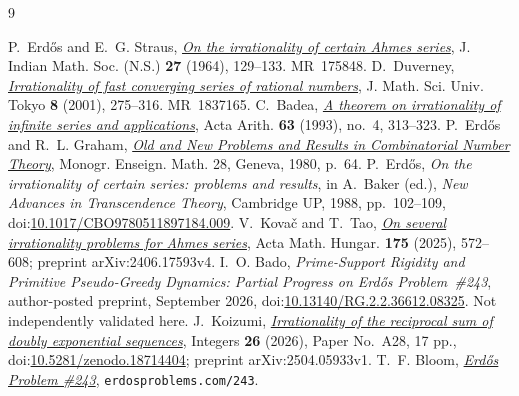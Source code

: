 \documentclass[11pt]{article}
\begin{document}
\begin{thebibliography}{9}
\small
\raggedright
\setlength{\itemsep}{0pt}
 P.~Erd\H{o}s and E.~G. Straus,
  \href{https://users.renyi.hu/~p_erdos/1964-19.pdf}{\emph{On the irrationality
  of certain Ahmes series}},
  J. Indian Math. Soc. (N.S.) \textbf{27} (1964), 129--133. MR~175848.
 D.~Duverney,
  \href{https://www.ms.u-tokyo.ac.jp/journal/pdf/jms080206.pdf}
  {\emph{Irrationality of fast converging series of rational numbers}},
  J. Math. Sci. Univ. Tokyo \textbf{8} (2001), 275--316. MR~1837165.
 C.~Badea,
  \href{https://matwbn.icm.edu.pl/ksiazki/aa/aa63/aa6342.pdf}{\emph{A theorem
  on irrationality of infinite series and applications}}, Acta Arith.
  \textbf{63} (1993), no.~4, 313--323.
 P.~Erd\H{o}s and R.~L. Graham,
  \href{https://mathweb.ucsd.edu/~ronspubs/80_11_number_theory.pdf}{\emph{Old
  and New Problems and Results in Combinatorial Number Theory}},
  Monogr. Enseign. Math. 28, Geneva, 1980, p.~64.
 P.~Erd\H{o}s, \emph{On the irrationality of certain series:
  problems and results}, in A.~Baker (ed.), \emph{New Advances in Transcendence
  Theory}, Cambridge UP, 1988, pp.~102--109,
  doi:\href{https://doi.org/10.1017/CBO9780511897184.009}{10.1017/CBO9780511897184.009}.
 V.~Kova\v{c} and T.~Tao,
  \href{https://arxiv.org/abs/2406.17593}{\emph{On several irrationality
  problems for Ahmes series}}, Acta Math. Hungar. \textbf{175} (2025),
  572--608; preprint arXiv:2406.17593v4.
 I.~O. Bado,
  \emph{Prime-Support Rigidity and Primitive Pseudo-Greedy Dynamics:
  Partial Progress on Erd\H{o}s Problem~\#243}, author-posted preprint,
  September 2026, doi:\href{https://doi.org/10.13140/RG.2.2.36612.08325}
  {10.13140/RG.2.2.36612.08325}.  Not independently validated here.
 J.~Koizumi,
  \href{https://math.colgate.edu/~integers/aa28/aa28.pdf}
  {\emph{Irrationality of the reciprocal sum of doubly exponential sequences}},
  Integers \textbf{26} (2026), Paper No.~A28, 17 pp.,
  doi:\href{https://doi.org/10.5281/zenodo.18714404}{10.5281/zenodo.18714404};
  preprint arXiv:2504.05933v1.
 T.~F. Bloom,
  \href{https://www.erdosproblems.com/243}{\emph{Erd\H{o}s Problem \#243}},
  \texttt{erdosproblems.com/243}.
\end{thebibliography}

\companionpapercontext
\end{document}
